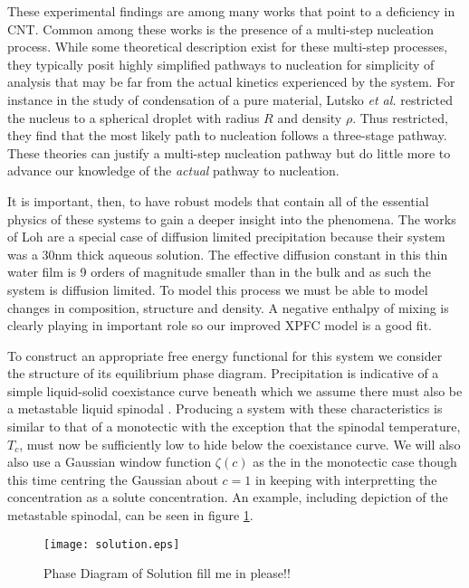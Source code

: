 These experimental findings are among many works that point to a deficiency in
CNT. Common among these works is the presence of a multi-step nucleation
process. While some theoretical description exist for these multi-step
processes, they typically posit highly simplified pathways to nucleation for
simplicity of analysis that may be far from the actual kinetics experienced by
the system.  For instance in the study of condensation of a pure material,
Lutsko \textit{et al.} \cite{LUTSKO15} restricted the nucleus to a spherical
droplet with radius $R$ and density $\rho$. Thus restricted, they find that the
most likely path to nucleation follows a three-stage pathway.  These theories
can justify a multi-step nucleation pathway but do little more to advance our
knowledge of the \textit{actual} pathway to nucleation.

It is important, then, to have robust models that contain all of the essential
physics of these systems to gain a deeper insight into the phenomena. The works
of Loh \cite{LOH17} are a special case of diffusion limited precipitation because
their system was a 30nm thick aqueous solution. The effective diffusion
constant in this thin water film is 9 orders of magnitude smaller than in the
bulk and as such the system is diffusion limited. To model this process we must
be able to  model changes in composition, structure and density. A negative
enthalpy of mixing is clearly playing in important role so our improved XPFC
model is a good fit.

To construct an appropriate free energy functional for this system we consider
the structure of its equilibrium phase diagram. Precipitation is indicative of
a simple liquid-solid coexistance curve beneath which we assume there must also
be a metastable liquid spinodal \cite{DAVEY13}. Producing a system with these
characteristics is similar to that of a monotectic with the exception that the
spinodal temperature, $T_c$, must now be sufficiently low to hide below the
coexistance curve. We will also also use a Gaussian window function $\zeta(c)$
as the in the monotectic case though this time centring the Gaussian about $c =
1$ in keeping with interpretting the concentration as a solute concentration.
An example, including depiction of the metastable spinodal, can be seen in
figure \ref{fig:precip_phase_dia}.

\begin{figure}
    \centering	
    \texttt{[image: solution.eps]}
    \caption[Coexistance Phase Diagram with Metastable Spinodal]{
        \label{fig:precip_phase_dia} Phase Diagram of Solution \color{ForestGreen} fill
        me in please!!
    }
\end{figure}

